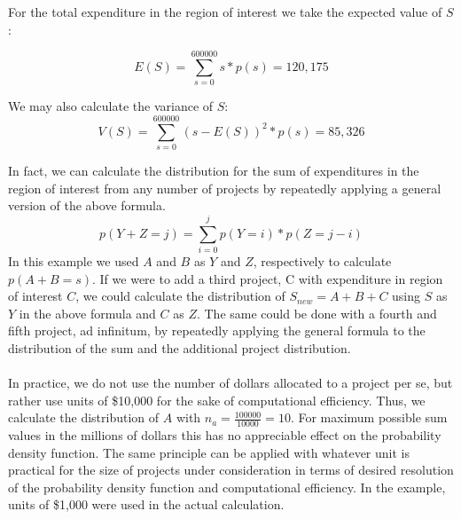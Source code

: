 \documentclass[12pt]{article}
\begin{document}
\noindent For the total expenditure in the region of interest we take the expected value of $S$:

\begin{equation}
E(S) = \sum_{s=0}^{600000}s*p(s) = 120,175
\end{equation}

\noindent We may also calculate the variance of $S$:
\begin{equation}
V(S) = \sum_{s=0}^{600000}(s-E(S))^2 * p(s) = 85,326
\end{equation}


\noindent In fact, we can calculate the distribution for the sum of expenditures in the region of interest from any number of projects by repeatedly applying a general version of the above formula.
\begin{equation}
p(Y + Z = j) = \sum_{i=0}^{j}p(Y=i) * p(Z = j-i)
\end{equation}
In this example we used $A$ and $B$ as $Y$ and $Z$, respectively to calculate $p(A + B = s)$. If we were to add a third project, C with expenditure in region of interest $C$, we could calculate the distribution of $S_{new}=A+B+C$ using $S$ as $Y$ in the above formula and $C$ as $Z$. The same could be done with a fourth and fifth project, ad infinitum, by repeatedly applying the general formula to the distribution of the sum and the additional project distribution.
\\ \\In practice, we do not use the number of dollars allocated to a project per se, but rather use units of \$10,000 for the sake of computational efficiency. Thus, we calculate the distribution of $A$ with $n_a = \frac{100000}{10000} = 10$. For maximum possible sum values in the millions of dollars this has no appreciable effect on the probability density function. The same principle can be applied with whatever unit is practical for the size of projects under consideration in terms of desired resolution of the probability density function and computational efficiency. In the example, units of \$1,000 were used in the actual calculation.

\break
\end{document}
